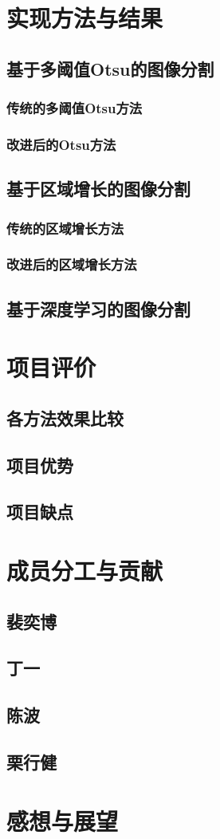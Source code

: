 \documentclass[UTF8]{ctexart}
\begin{document}
\section{实现方法与结果}
\subsection{基于多阈值Otsu的图像分割}
\subsubsection{传统的多阈值Otsu方法}
\subsubsection{改进后的Otsu方法}


\subsection{基于区域增长的图像分割}
\subsubsection{传统的区域增长方法}
\subsubsection{改进后的区域增长方法}

\subsection{基于深度学习的图像分割}


\section{项目评价}
\subsection{各方法效果比较}
\subsection{项目优势}
\subsection{项目缺点}

\section{成员分工与贡献}
\subsection{裴奕博}
\subsection{丁一}
\subsection{陈波}
\subsection{栗行健}

\section{感想与展望}
\end{document}
